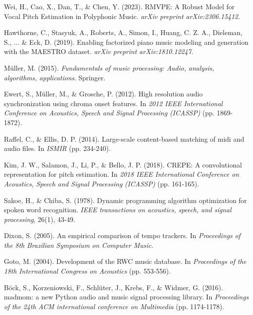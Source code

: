 \documentclass[12pt,a4paper]{article}
\begin{document}

\begin{thebibliography}{10}

Wei, H., Cao, X., Dan, T., \& Chen, Y. (2023). RMVPE: A Robust Model for Vocal Pitch Estimation in Polyphonic Music. \textit{arXiv preprint arXiv:2306.15412}.

Hawthorne, C., Stasyuk, A., Roberts, A., Simon, I., Huang, C. Z. A., Dieleman, S., ... \& Eck, D. (2019). Enabling factorized piano music modeling and generation with the MAESTRO dataset. \textit{arXiv preprint arXiv:1810.12247}.

Müller, M. (2015). \textit{Fundamentals of music processing: Audio, analysis, algorithms, applications}. Springer.

Ewert, S., Müller, M., \& Grosche, P. (2012). High resolution audio synchronization using chroma onset features. In \textit{2012 IEEE International Conference on Acoustics, Speech and Signal Processing (ICASSP)} (pp. 1869-1872).

Raffel, C., \& Ellis, D. P. (2014). Large-scale content-based matching of midi and audio files. In \textit{ISMIR} (pp. 234-240).

Kim, J. W., Salamon, J., Li, P., \& Bello, J. P. (2018). CREPE: A convolutional representation for pitch estimation. In \textit{2018 IEEE International Conference on Acoustics, Speech and Signal Processing (ICASSP)} (pp. 161-165).

Sakoe, H., \& Chiba, S. (1978). Dynamic programming algorithm optimization for spoken word recognition. \textit{IEEE transactions on acoustics, speech, and signal processing}, 26(1), 43-49.

Dixon, S. (2005). An empirical comparison of tempo trackers. In \textit{Proceedings of the 8th Brazilian Symposium on Computer Music}.

Goto, M. (2004). Development of the RWC music database. In \textit{Proceedings of the 18th International Congress on Acoustics} (pp. 553-556).

Böck, S., Korzeniowski, F., Schlüter, J., Krebs, F., \& Widmer, G. (2016). madmom: a new Python audio and music signal processing library. In \textit{Proceedings of the 24th ACM international conference on Multimedia} (pp. 1174-1178).

\end{thebibliography}
\end{document}
